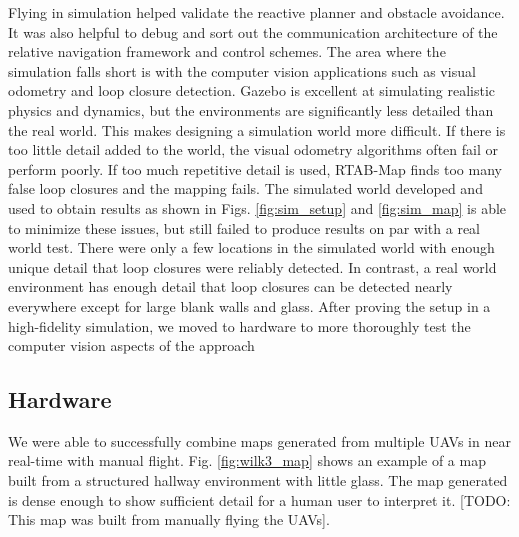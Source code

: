 \documentclass[letterpaper, 10 pt, conference]{ieeeconf}  %
\newcommand{\todo}[1]{{\color{blue}[TODO: #1]}}
\begin{document}
Flying in simulation helped validate the reactive planner and obstacle avoidance. It was also helpful to debug and sort out the communication architecture of the relative navigation framework and control schemes. The area where the simulation falls short is with the computer vision applications such as visual odometry and loop closure detection. Gazebo is excellent at simulating realistic physics and dynamics, but the environments are significantly less detailed than the real world. This makes designing a simulation world more difficult. If there is too little detail added to the world, the visual odometry algorithms often fail or perform poorly. If too much repetitive detail is used, RTAB-Map finds too many false loop closures and the mapping fails. The simulated world developed and used to obtain results as shown in Figs. \ref{fig:sim_setup} and \ref{fig:sim_map} is able to minimize these issues, but still failed to produce results on par with a real world test. There were only a few locations in the simulated world with enough unique detail that loop closures were reliably detected. In contrast, a real world environment has enough detail that loop closures can be detected nearly everywhere except for large blank walls and glass. After proving the setup in a high-fidelity simulation, we moved to hardware to more thoroughly test the computer vision aspects of the approach

\subsection{Hardware}

We were able to successfully combine maps generated from multiple UAVs in near real-time with manual flight. Fig. \ref{fig:wilk3_map} shows an example of a map built from a structured hallway environment with little glass. The map generated is dense enough to show sufficient detail for a human user to interpret it. \todo{This map was built from manually flying the UAVs}.

\end{document}
